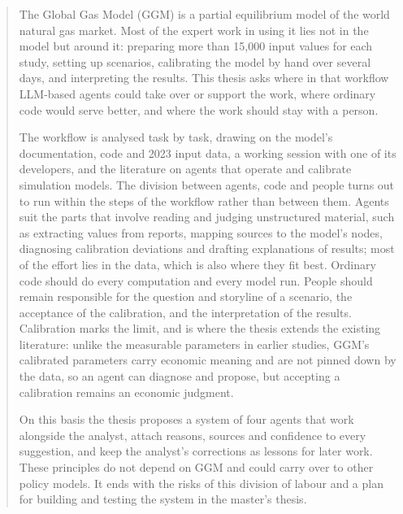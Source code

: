 \begin{abstract}
The Global Gas Model (GGM) is a partial equilibrium model of the world natural gas market.
Most of the expert work in using it lies not in the model but around it: preparing more than 15,000 input values for each study, setting up scenarios, calibrating the model by hand over several days, and interpreting the results.
This thesis asks where in that workflow LLM-based agents could take over or support the work, where ordinary code would serve better, and where the work should stay with a person.

The workflow is analysed task by task, drawing on the model's documentation, code and 2023 input data, a working session with one of its developers, and the literature on agents that operate and calibrate simulation models.
The division between agents, code and people turns out to run within the steps of the workflow rather than between them.
Agents suit the parts that involve reading and judging unstructured material, such as extracting values from reports, mapping sources to the model's nodes, diagnosing calibration deviations and drafting explanations of results; most of the effort lies in the data, which is also where they fit best.
Ordinary code should do every computation and every model run.
People should remain responsible for the question and storyline of a scenario, the acceptance of the calibration, and the interpretation of the results.
Calibration marks the limit, and is where the thesis extends the existing literature: unlike the measurable parameters in earlier studies, GGM's calibrated parameters carry economic meaning and are not pinned down by the data, so an agent can diagnose and propose, but accepting a calibration remains an economic judgment.

On this basis the thesis proposes a system of four agents that work alongside the analyst, attach reasons, sources and confidence to every suggestion, and keep the analyst's corrections as lessons for later work.
These principles do not depend on GGM and could carry over to other policy models.
It ends with the risks of this division of labour and a plan for building and testing the system in the master's thesis.
\end{abstract}
